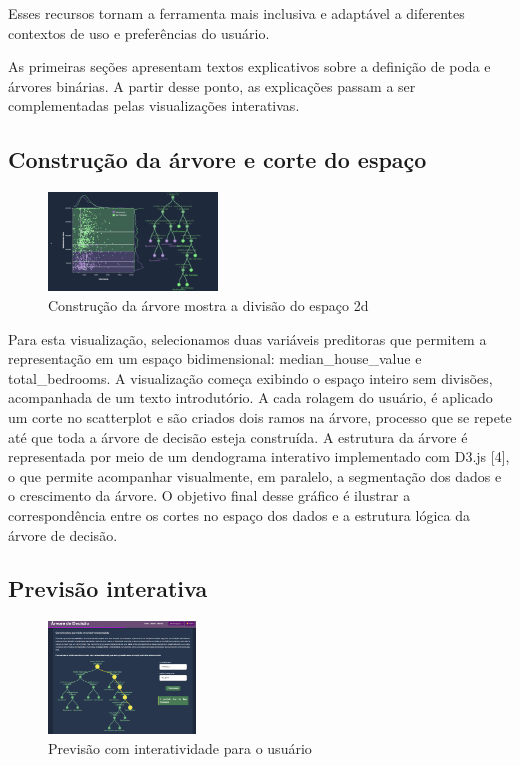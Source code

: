 \documentclass[conference]{IEEEtran}
\begin{document}
Esses recursos tornam a ferramenta mais inclusiva e adaptável a diferentes contextos de uso e preferências do usuário.

As primeiras seções apresentam textos explicativos sobre a definição de poda e árvores binárias. A partir desse ponto, as explicações passam a ser complementadas pelas visualizações interativas.

\subsection{Construção da árvore e corte do espaço}
\begin{figure}[h]
    \centering
    \includegraphics[width=0.4\textwidth]{treeCut.png}
    \caption{Construção da árvore mostra a divisão do espaço 2d}
    \label{fig:minha_imagem}
\end{figure}

Para esta visualização, selecionamos duas variáveis preditoras que permitem a representação em um espaço bidimensional: median\_house\_value e total\_bedrooms. A visualização começa exibindo o espaço inteiro sem divisões, acompanhada de um texto introdutório. A cada rolagem do usuário, é aplicado um corte no scatterplot e são criados dois ramos na árvore, processo que se repete até que toda a árvore de decisão esteja construída. A estrutura da árvore é representada por meio de um dendograma interativo implementado com D3.js [4], o que permite acompanhar visualmente, em paralelo, a segmentação dos dados e o crescimento da árvore. O objetivo final desse gráfico é ilustrar a correspondência entre os cortes no espaço dos dados e a estrutura lógica da árvore de decisão.


\subsection{Previsão interativa}

\begin{figure}[h]
    \centering
    \includegraphics[width=0.35\textwidth]{prev.png}
    \caption{Previsão com interatividade para o usuário}
    \label{fig:minha_imagem}
\end{figure}
\end{document}
